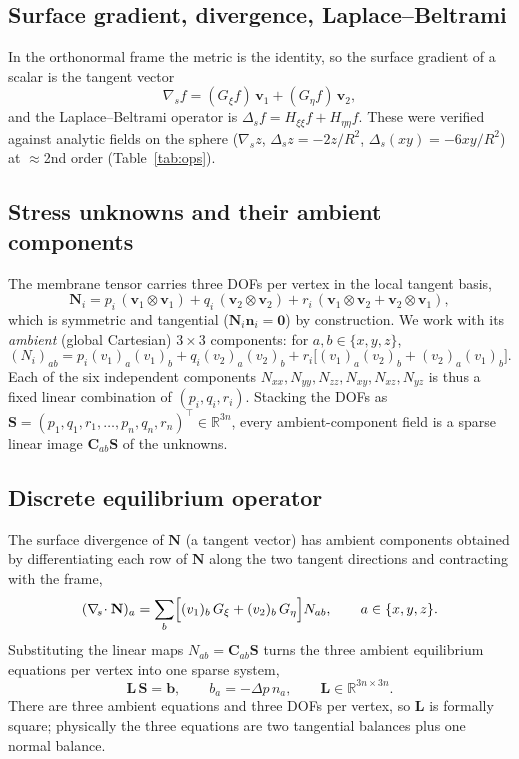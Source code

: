 \documentclass[11pt]{article}
\newcommand{\vv}[1]{\bm{#1}}
\newcommand{\NN}{\mathbf{N}}
\newcommand{\divs}{\nabla_{\!s}\!\cdot}
\begin{document}
\subsection{Surface gradient, divergence, Laplace--Beltrami}
In the orthonormal frame the metric is the identity, so the surface gradient of a scalar is
the tangent vector
\begin{equation}
  \nabla_s f=(G_\xi f)\,\vv v_1+(G_\eta f)\,\vv v_2 ,
\end{equation}
and the Laplace--Beltrami operator is $\Delta_s f=H_{\xi\xi}f+H_{\eta\eta}f$. These were
verified against analytic fields on the sphere ($\nabla_s z$, $\Delta_s z=-2z/R^2$,
$\Delta_s(xy)=-6xy/R^2$) at $\approx$2nd order (Table~\ref{tab:ops}).

\subsection{Stress unknowns and their ambient components}
The membrane tensor carries three DOFs per vertex in the local tangent basis,
\begin{equation}
  \NN_i=p_i\,(\vv v_1\!\otimes\!\vv v_1)+q_i\,(\vv v_2\!\otimes\!\vv v_2)
    +r_i\,(\vv v_1\!\otimes\!\vv v_2+\vv v_2\!\otimes\!\vv v_1),
  \label{eq:Nlocal}
\end{equation}
which is symmetric and tangential ($\NN_i\vv n_i=\vv0$) by construction. We work with its
\emph{ambient} (global Cartesian) $3\times3$ components: for $a,b\in\{x,y,z\}$,
\begin{equation}
  (N_i)_{ab}=p_i (v_1)_a(v_1)_b+q_i (v_2)_a(v_2)_b
    +r_i\bigl[(v_1)_a(v_2)_b+(v_2)_a(v_1)_b\bigr].
  \label{eq:Nambient}
\end{equation}
Each of the six independent components $N_{xx},N_{yy},N_{zz},N_{xy},N_{xz},N_{yz}$ is thus a
fixed linear combination of $(p_i,q_i,r_i)$. Stacking the DOFs as
$\vv S=(p_1,q_1,r_1,\dots,p_n,q_n,r_n)^{\!\top}\in\mathbb R^{3n}$, every ambient-component
field is a sparse linear image $\mathbf C_{ab}\vv S$ of the unknowns.

\subsection{Discrete equilibrium operator}
The surface divergence of $\NN$ (a tangent vector) has ambient components obtained by
differentiating each row of $\NN$ along the two tangent directions and contracting with the
frame,
\begin{equation}
  (\divs\NN)_a
  =\sum_{b}\Bigl[(v_1)_b\,G_\xi+(v_2)_b\,G_\eta\Bigr]N_{ab},
  \qquad a\in\{x,y,z\}.
  \label{eq:divN}
\end{equation}
Substituting the linear maps $N_{ab}=\mathbf C_{ab}\vv S$ turns the three ambient equilibrium
equations per vertex into one sparse system,
\begin{equation}
  \mathbf L\,\vv S=\vv b,\qquad b_a=-\Delta p\,n_a,\qquad
  \mathbf L\in\mathbb R^{3n\times3n}.
  \label{eq:Lsystem}
\end{equation}
There are three ambient equations and three DOFs per vertex, so $\mathbf L$ is formally
square; physically the three equations are two tangential balances plus one normal balance.
\end{document}
